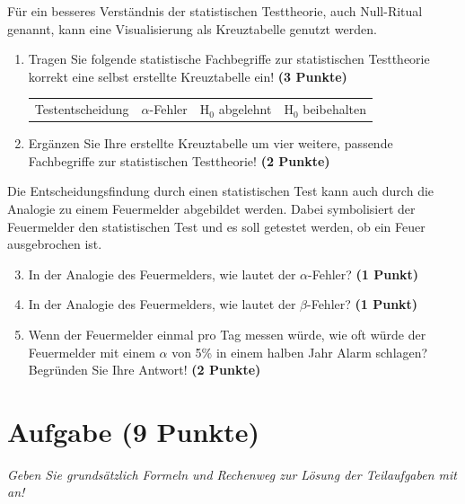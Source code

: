 \documentclass[a4paper, 9pt]{scrartcl}\usepackage[]{graphicx}\usepackage[]{xcolor}
\begin{document}
F{\"u}r ein besseres Verst{\"a}ndnis der statistischen Testtheorie, auch
Null-Ritual genannt, kann eine Visualisierung als Kreuztabelle genutzt werden.  

\begin{enumerate}
\item Tragen Sie folgende statistische Fachbegriffe zur statistischen
  Testtheorie korrekt eine selbst erstellte Kreuztabelle ein! \textbf{(3
    Punkte)}
  \begin{center}
  \begin{tabular}{cccc}
  Testentscheidung & $\alpha$-Fehler & H$_0$ abgelehnt & H$_0$ beibehalten \\
  \end{tabular}
  \end{center}
\item Erg{\"a}nzen Sie Ihre erstellte Kreuztabelle um vier weitere, passende
  Fachbegriffe zur statistischen Testtheorie! \textbf{(2 Punkte)}
\end{enumerate}

Die Entscheidungsfindung durch einen statistischen Test kann auch durch die
Analogie zu einem Feuermelder abgebildet werden. Dabei symbolisiert der
Feuermelder den statistischen Test und es soll getestet werden, ob ein Feuer
ausgebrochen ist.

\begin{enumerate}
  \setcounter{enumi}{2}    
\item In der Analogie des Feuermelders, wie lautet der $\alpha$-Fehler? \textbf{(1 Punkt)}
\item In der Analogie des Feuermelders, wie lautet der $\beta$-Fehler? \textbf{(1 Punkt)}
\item Wenn der Feuermelder einmal pro Tag messen w{\"u}rde, wie oft w{\"u}rde der
  Feuermelder mit einem $\alpha$ von 5\% in einem halben Jahr Alarm schlagen?
  Begr{\"u}nden Sie Ihre Antwort! \textbf{(2 Punkte)}
\end{enumerate}



 
\clearpage

\section{Aufgabe \hfill (9 Punkte)}

\textit{Geben Sie grunds{\"a}tzlich Formeln und Rechenweg zur L{\"o}sung der
  Teilaufgaben mit an!} \\[1Ex]
\end{document}
